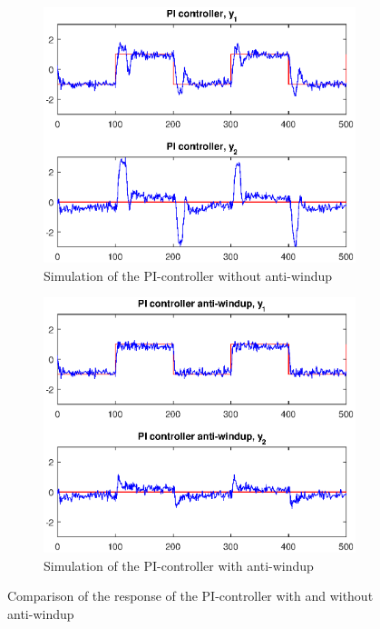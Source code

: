 \documentclass[a4paper]{scrartcl}
\begin{document}
\begin{figure}
\centering
\begin{subfigure}{.5\textwidth}
	\centering
	\includegraphics[width = .9\linewidth]{fig/task1/PI.eps}
	\caption{Simulation of the PI-controller without anti-windup}
	\label{fig:PIsimwithout}	
\end{subfigure}%
\begin{subfigure}{.5\textwidth}
	\centering
	\includegraphics[width = .9\linewidth]{fig/task1/PI_antiwindup.eps}
	\caption{Simulation of the PI-controller with anti-windup}
	\label{fig:PIsimwith}	
\end{subfigure}
\caption{Comparison of the response of the PI-controller with and without anti-windup}
\label{fig:PIsim}
\end{figure}
\end{document}
